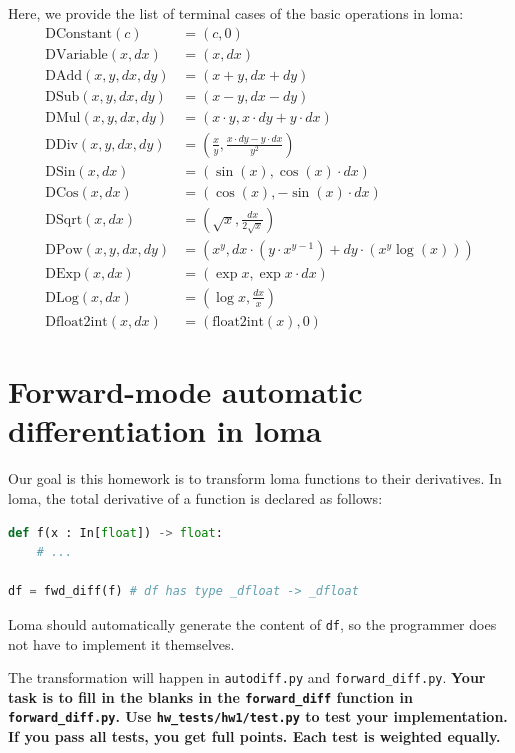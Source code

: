 Here, we provide the list of terminal cases of the basic operations in loma:
\begin{equation}
\begin{aligned}
\text{DConstant}(c) &= (c, 0) \\
\text{DVariable}(x, dx) &= (x, dx) \\
\text{DAdd}(x, y, dx, dy) &= (x + y, dx + dy) \\
\text{DSub}(x, y, dx, dy) &= (x - y, dx - dy) \\
\text{DMul}(x, y, dx, dy) &= (x \cdot y, x \cdot dy + y \cdot dx) \\
\text{DDiv}(x, y, dx, dy) &= \left(\frac{x}{y}, \frac{x \cdot dy - y \cdot dx}{y^2}\right) \\
\text{DSin}(x, dx) &= \left(\sin(x), \cos(x) \cdot dx\right) \\
\text{DCos}(x, dx) &= \left(\cos(x), -\sin(x) \cdot dx\right) \\
\text{DSqrt}(x, dx) &= \left(\sqrt{x}, \frac{dx}{2\sqrt{x}}\right) \\
\text{DPow}(x, y, dx, dy) &= \left(x^y, dx \cdot \left(y \cdot x^{y-1}\right) + dy \cdot \left(x^y \log(x)\right)\right) \\
\text{DExp}(x, dx) &= \left(\exp{x}, \exp{x} \cdot dx\right) \\
\text{DLog}(x, dx) &= \left(\log{x}, \frac{dx}{x}\right) \\
\text{Dfloat2int}(x, dx) &= \left(\text{float2int}(x), 0\right)
\end{aligned}
\end{equation}

\section{Forward-mode automatic differentiation in loma}

Our goal is this homework is to transform loma functions to their derivatives. In loma, the total derivative of a function is declared as follows:
\begin{lstlisting}[language=Python]
def f(x : In[float]) -> float:
    # ...

df = fwd_diff(f) # df has type _dfloat -> _dfloat
\end{lstlisting}

Loma should automatically generate the content of \lstinline{df}, so the programmer does not have to implement it themselves.

The transformation will happen in \lstinline{autodiff.py} and \lstinline{forward_diff.py}. \textbf{Your task is to fill in the blanks in the \lstinline{forward_diff} function in \lstinline{forward_diff.py}. Use \lstinline{hw_tests/hw1/test.py} to test your implementation. If you pass all tests, you get full points. Each test is weighted equally.}

